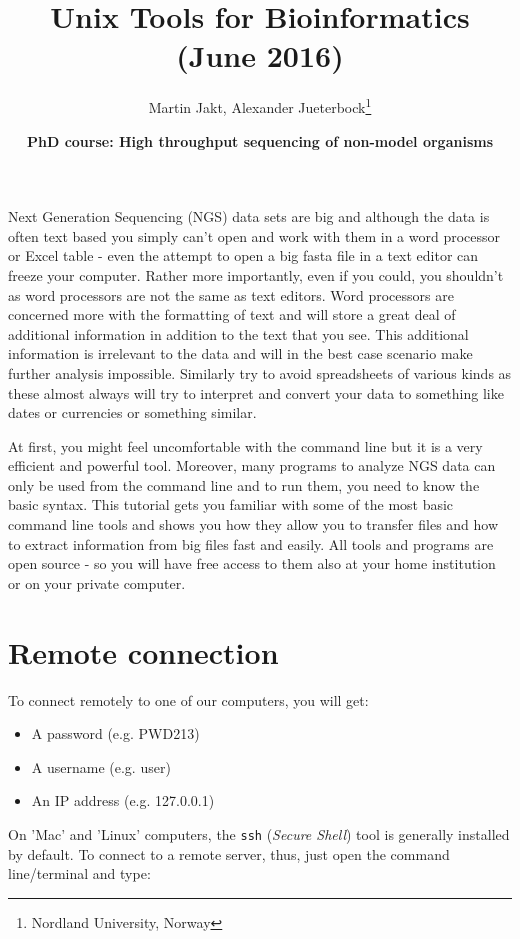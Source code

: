\documentclass[11pt]{article}
\author{Martin Jakt, Alexander Jueterbock\thanks{Nordland University, Norway}}
\date{\textbf{PhD course: High throughput sequencing of non-model organisms}}
\title{\textbf{Unix Tools for Bioinformatics} (June 2016)}
\begin{document}
\maketitle
\tableofcontents

Next Generation Sequencing (NGS) data sets are big and although the data is
often text based you
simply can't open and work with them in a word processor or Excel
table - even the attempt to open a big fasta file in a text editor can
freeze your computer. Rather more importantly, even if you could, you
shouldn't as word processors are not the same as text editors. Word
processors are concerned more with the formatting of text and will store a
great deal of additional information in addition to the text that you
see. This additional information is irrelevant to the data and will in the
best case scenario make further analysis impossible. Similarly try to avoid
spreadsheets of various kinds as these almost always will try to interpret
and convert your data to something like dates or currencies or something similar.

At first, you might feel uncomfortable with the
command line but it is a very efficient and powerful tool. Moreover,
many programs to analyze NGS data can only be used from the command line and to
run them, you need to know the basic syntax. This tutorial gets you
familiar with some of the most basic command line tools and shows
you how they allow you to transfer files and how to extract
information from big files fast and easily. All tools and programs are
open source - so you will have free access to them also at your home
institution or on your private computer.


\section{Remote connection}
\label{sec:orgheadline1}
To connect remotely to one of our computers, you will get:

\begin{itemize}
\item A password (e.g. PWD213)
\item A username (e.g. user)
\item An IP address (e.g. 127.0.0.1)
\end{itemize}

On 'Mac' and 'Linux' computers, the \texttt{ssh} (\emph{Secure Shell}) tool is
generally installed by default. To connect to a remote server, thus,
just open the command line/terminal and type:
\end{document}
